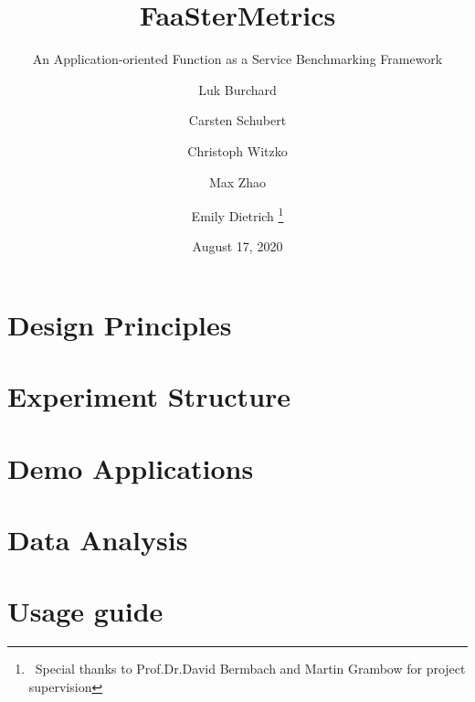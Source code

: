 \documentclass[english,12pt,numbers=noenddot]{scrreprt}
\newif\ifmtrklnum{}
\begin{document}
%
\titlehead{%
  \texttt{[image: MCC\_Header.png]}
}
%
\title{FaaSterMetrics}
\subtitle{An Application-oriented Function as a Service Benchmarking Framework}
%
\ifmtrklnum{}
\author{Luk Burchard ()
  \and Carsten Schubert (380852) 
  \and Christoph Witzko (373678)
  \and Max Zhao ()
  \and Emily Dietrich (380817)~%
  \thanks{~Special thanks to Prof.\@ Dr.\@ David Bermbach and Martin Grambow for project supervision}}
\else
\author{Luk Burchard %
  \and Carsten Schubert %
  \and Christoph Witzko %
  \and Max Zhao %
  \and Emily Dietrich%
  \thanks{~Special thanks to Prof.\@ Dr.\@ David Bermbach and Martin Grambow for project supervision}}
\fi
%
\date{August 17, 2020}
\maketitle

\renewcommand*\contentsname{Structure}
\tableofcontents
\listoffigures
\listoftables
\newpage



\chapter{Design Principles}\label{chap:DesignPrinciples}





\chapter{Experiment Structure}\label{chap:ExperimentStructure}



\chapter{Demo Applications}\label{chap:DemoApplications}




\chapter{Data Analysis}


\chapter{Usage guide}\label{chap:UsageGuide}







\appendix

\end{document}
